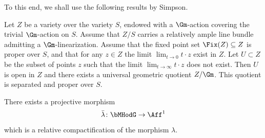 To this end, we shall use the following results by Simpson.

\begin{prop}\label{geometricquotient}
Let $Z$ be a variety over the variety
$S$, endowed with a $\Gm$\nobreakdash-action covering the trivial $\Gm$\nobreakdash-action on $S$. Assume that $Z/S$ carries a relatively ample line
bundle admitting a $\Gm$\nobreakdash-linearization. Assume that the fixed point set $\Fix(Z) \subseteq Z$ is proper over
$S$, and that for any $z \in Z$ the limit $\lim_{t \to 0} t \cdot z$ exist in $Z$. Let $U \subset Z$ be the subset of points $z$ such that the limit $\lim_{t \to \infty} t \cdot z$ does
not exist. Then $U$ is open in $Z$ and there exists
a universal geometric quotient $Z/\Gm$. This quotient is separated and proper over $S$.
\end{prop}
\begin{thm}\label{thm:compactification}
There exists a projective morphism
\[
\bar{\lambda}\colon \bMHodG \to \Aff^1
\]
which is a relative compactification of the morphism $\lambda$.
\end{thm}
